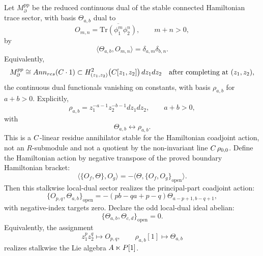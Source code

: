 \documentclass[11pt]{memoir}
\begin{document}
\begin{constr}\label{constr:boundary-local-dual-principal-parts}
  Let $M_{\partial}^{\mathrm{pp}}$ be the reduced continuous dual of the stable
  connected Hamiltonian trace sector, with basis $\Theta_{a,b}$ dual to
  $$O_{m,n}=\overline{\mathrm{Tr}(\phi_1^m\phi_2^n)},\qquad m+n>0,$$
  by
  $$\langle\Theta_{a,b},O_{m,n}\rangle=\delta_{a,m}\delta_{b,n}.$$
  Equivalently,
  $$M_{\partial}^{pp}\cong
    Ann_{res}(C\cdot1)\subset
    H^2_{(z_1,z_2)}\bigl(C[z_1,z_2]\bigr)\,dz_1dz_2
    \quad\text{after completing at }(z_1,z_2),$$
  the continuous dual functionals vanishing on constants, with basis
  $\rho_{a,b}$ for $a+b>0$. Explicitly,
  $$\rho_{a,b}=z_1^{-a-1}z_2^{-b-1}dz_1dz_2,\qquad a+b>0,$$
  with
  $$\Theta_{a,b}\longleftrightarrow\rho_{a,b}.$$
  This is a \(C\)-linear residue annihilator stable for the Hamiltonian
  coadjoint action, not an \(R\)-submodule and not a quotient by the
  non-invariant line \(C\,\rho_{0,0}\).
  Define the Hamiltonian action by negative transpose of the proved boundary
  Hamiltonian bracket:
  $$\langle\{O_f,\Theta\},O_g\rangle
    =-\langle\Theta,\{O_f,O_g\}_{\mathrm{open}}\rangle.$$
  Then this stalkwise local-dual sector realizes the principal-part coadjoint
  action:
  $$\{O_{p,q},\Theta_{a,b}\}_{\mathrm{open}}
    =-(pb-qa+p-q)\Theta_{a-p+1,b-q+1},$$
  with negative-index targets zero. Declare the odd local-dual ideal abelian:
  $$\{\Theta_{a,b},\Theta_{c,d}\}_{\mathrm{open}}=0.$$
  Equivalently, the assignment
  $$z_1^pz_2^q\longmapsto O_{p,q},\qquad
    \rho_{a,b}[1]\longmapsto\Theta_{a,b}$$
  realizes stalkwise the Lie algebra
  $A\ltimes P[1]$.
\end{constr}
\end{document}
